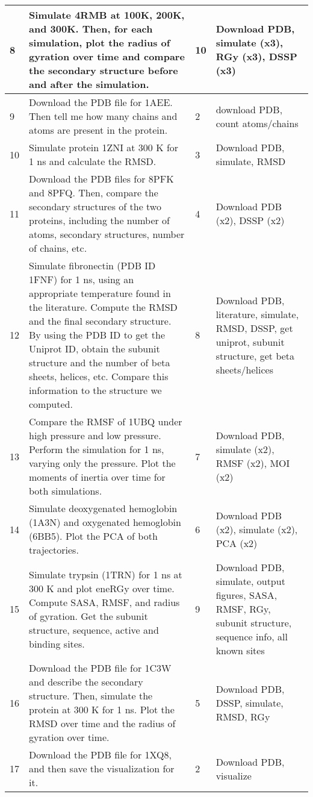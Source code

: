 \begin{longtable}[]{|p{}|p{}|p{}|p{}|}
8 & Simulate 4RMB at 100K, 200K, and 300K. Then, for each simulation, plot the radius of gyration over time and compare the secondary structure before and after the simulation. & 10 & Download PDB, simulate (x3), RGy (x3), DSSP (x3) \\ \hline
9 & Download the PDB file for 1AEE. Then tell me how many chains and atoms are present in the protein. & 2 & download PDB, count atoms/chains \\ \hline
10 & Simulate protein 1ZNI at 300 K for 1 ns and calculate the RMSD. & 3 & Download PDB, simulate, RMSD \\ \hline
11 & Download the PDB files for 8PFK and 8PFQ. Then, compare the secondary structures of the two proteins, including the number of atoms, secondary structures, number of chains, etc. & 4 & Download PDB (x2), DSSP (x2) \\ \hline
12 & Simulate fibronectin (PDB ID 1FNF) for 1 ns, using an appropriate temperature found in the literature. Compute the RMSD and the final secondary structure. By using the PDB ID to get the Uniprot ID, obtain the subunit structure and the number of beta sheets, helices, etc. Compare this information to the structure we computed. & 8 & Download PDB, literature, simulate, RMSD, DSSP, get uniprot, subunit structure, get beta sheets/helices \\ \hline
13 & Compare the RMSF of 1UBQ under high pressure and low pressure. Perform the simulation for 1 ns, varying only the pressure. Plot the moments of inertia over time for both simulations. & 7 & Download PDB, simulate (x2), RMSF (x2), MOI (x2) \\ \hline
14 & Simulate deoxygenated hemoglobin (1A3N) and oxygenated hemoglobin (6BB5). Plot the PCA of both trajectories. & 6 & Download PDB (x2), simulate (x2), PCA (x2) \\ \hline
15 & Simulate trypsin (1TRN) for 1 ns at 300 K and plot eneRGy over time. Compute SASA, RMSF, and radius of gyration. Get the subunit structure, sequence, active and binding sites. & 9 & Download PDB, simulate, output figures, SASA, RMSF, RGy, subunit structure, sequence info, all known sites \\ \hline
16 & Download the PDB file for 1C3W and describe the secondary structure. Then, simulate the protein at 300 K for 1 ns. Plot the RMSD over time and the radius of gyration over time. & 5 & Download PDB, DSSP, simulate, RMSD, RGy \\ \hline
17 & Download the PDB file for 1XQ8, and then save the visualization for it. & 2 & Download PDB, visualize \\ \hline

\end{longtable}
